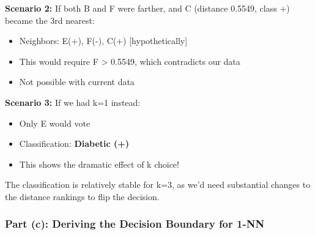 \documentclass[12pt]{article}
\begin{document}
\begin{computation}
\textbf{Scenario 2:} If both B and F were farther, and C (distance 0.5549, class +) became the 3rd nearest:
\begin{itemize}
    \item Neighbors: E(+), F(-), C(+) [hypothetically]
    \item This would require F > 0.5549, which contradicts our data
    \item Not possible with current data
\end{itemize}

\textbf{Scenario 3:} If we had k=1 instead:
\begin{itemize}
    \item Only E would vote
    \item Classification: \textbf{Diabetic (+)}
    \item This shows the dramatic effect of k choice!
\end{itemize}

The classification is relatively stable for k=3, as we'd need substantial changes to the distance rankings to flip the decision.
\end{computation}

\subsubsection{Part (c): Deriving the Decision Boundary for 1-NN}
\end{document}
